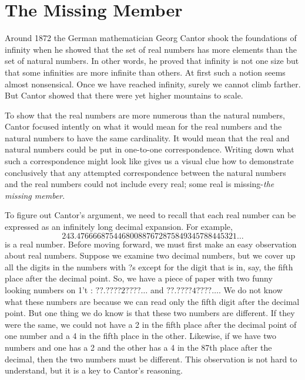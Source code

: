 \section{The Missing Member}  \label{sec:MissingMember}\solnsfalse

Around 1872 the German mathematician Georg Cantor shook the foundations of infinity when he showed that the set of real numbers has more elements than the set of natural numbers. In other words, he proved that infinity is not one size but that some infinities are more infinite than others. At first such a notion seems almost nonsensical. Once we have reached infinity, surely we cannot climb farther. But Cantor showed that there were yet higher mountains to scale.

To show that the real numbers are more numerous than the natural numbers, Cantor focused intently on what it would mean for the real numbers and the natural numbers to have the same cardinality. It would mean that the real and natural numbers could be put in one-to-one correspondence. Writing down what such a correspondence might look like gives us a visual clue how to demonstrate conclusively that any attempted correspondence between the natural numbers and the real numbers could not include every real; some real is missing-\emph{the missing member}.

To figure out Cantor's argument, we need to recall that each real number can be expressed as an infinitely long decimal expansion. For example,
\[ 243.4 76666875446800887672875849345788445321 \dots\]
is a real number. Before moving forward, we must first make an easy observation about real numbers. Suppose we examine two decimal numbers, but we cover up all the digits in the numbers with ?s except for the digit that is in, say, the fifth place after the decimal point. So, we have a piece of paper with two funny looking numbers on 1't : $??.????2????\dots$ and $??.????4????\dots$. We do not know what these numbers are because we can read only the fifth digit after the decimal point. But one thing we do know is that these two numbers are different. If they were the same, we could not have a 2 in the fifth place after the decimal point of one number and a 4 in the fifth place in the other. Likewise, if we have two numbers and one has a 2 and the other has a 4 in the 87th place after the decimal, then the two numbers must be different. This observation is not hard to understand, but it is a key to Cantor's reasoning.  

